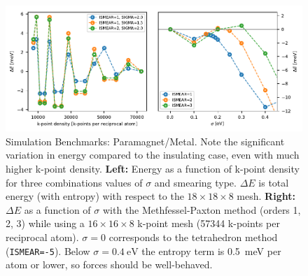 \begin{figure}
    \centering
    \includegraphics{fig/simulation/convergence_metal.pdf}
    \caption[Simulation Benchmarks: Paramagnet/Metal]{Simulation Benchmarks: Paramagnet/Metal. Note the significant variation in energy compared to the insulating case, even with much higher k-point density. \textbf{Left:} Energy as a function of k-point density for three combinations values of $\sigma$ and smearing type. $\Delta E$ is total energy (with entropy) with respect to the $18 \times 18 \times 8$ mesh. \textbf{Right:} $\Delta E$ as a function of $\sigma$ with the Methfessel-Paxton method (orders 1, 2, 3) while using a $16 \times 16 \times 8$ k-point mesh (57344 k-points per reciprocal atom). $\sigma=0$ corresponds to the tetrahedron method (\texttt{ISMEAR=-5}). Below $\sigma = \SI{0.4}{\eV}$ the entropy term is \SI{0.5}{\milli\eV} per atom or lower, so forces should be well-behaved.}
    \label{fig:sim_bench_para}
\end{figure}

